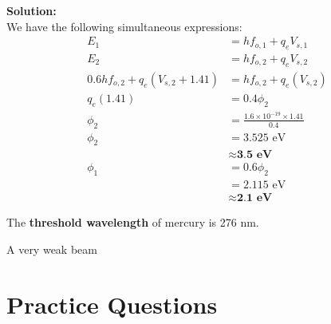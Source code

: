 \documentclass[a4paper, 12pt, addpoints]{exam}
\begin{document}
\begin{questions}
\begin{tcolorbox}
\textbf{Solution: }\\
We have the following simultaneous expressions:
\begin{align*}
    E_1 &= hf_{o, 1} + q_eV_{s, 1} \\
    E_2 &= hf_{o, 2} + q_eV_{s, 2} \\
    0.6 hf_{o, 2} + q_e(V_{s, 2} + 1.41) &= hf_{o, 2} + q_e (V_{s,2}) \\
    q_e (1.41) &= 0.4 \phi_2 \\
    \phi_2 &= \frac{1.6\times 10^{-19} \times 1.41}{0.4} \\
    \phi_2 &= 3.525\text{ eV} \\
    &\approx \textbf{3.5 eV} \\
    \phi_1 &= 0.6 \phi_2 \\
    &= 2.115\text{ eV} \\
    &\approx \textbf{2.1 eV}
\end{align*}

\end{tcolorbox}


\question The \textbf{threshold wavelength} of mercury is 276 nm.


\question A very weak beam
\end{questions}
\newpage

\section{Practice Questions}

\begin{questions}
\question 

\end{questions}
\end{document}
